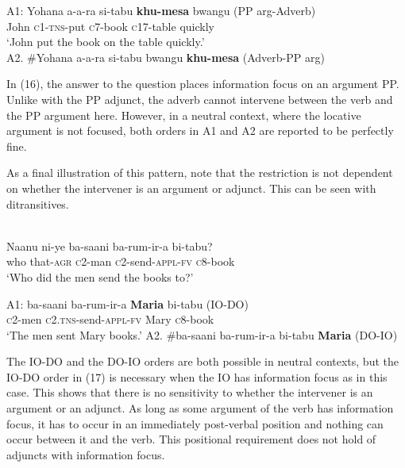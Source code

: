 \documentclass[output=paper]{langsci/langscibook}
\begin{document}
\ea\label{ex:}
\gll A1:  Yohana    a-a-ra  si-tabu    \textbf{{khu-mesa}}  bwangu     (PP arg-Adverb) \\
       John       \textsc{c1-tns-}put  \textsc{c}7-book   \textsc{c}17-table   quickly\\
\glt   ‘John put the book on the table quickly.’   \\ 
 A2.  \#Yohana   a-a-ra   si-tabu      bwangu   \textbf{khu-mesa}         (Adverb-PP arg)\\
\z
 


In (16), the answer to the question places information focus on an argument PP. Unlike with the PP adjunct, the adverb cannot intervene between the verb and the PP argument here. However, in a neutral context, where the locative argument is not focused, both orders in A1 and A2 are reported to be perfectly fine.

  As a final illustration of this pattern, note that the restriction is not dependent on whether the intervener is an argument or adjunct. This can be seen with ditransitives. 


\ea\label{ex:}
\\
\gll   Naanu    ni-ye    ba-saani   ba-rum-ir-a     bi-tabu?\\
     who     that-\textsc{agr}   \textsc{c}2-man   \textsc{c}2-send-\textsc{appl-fv}   \textsc{c}8-book\\
\glt ‘Who did the men send the books to?’
\z




\ea\label{ex:}
\gll A1:  ba-saani   ba-rum-ir-a    \textbf{{Maria}}     bi-tabu       (IO-DO) \\
       \textsc{c}2-men   \textsc{c2.tns}-send-\textsc{appl-fv}   Mary      \textsc{c}8-book  \\
\glt    ‘The men sent Mary books.’
 A2.  \#ba-saani  ba-rum-ir-a      bi-tabu   \textbf{Maria}  (DO-IO) \\
\z

The IO-DO and the DO-IO orders are both possible in neutral contexts, but the IO-DO order in (17) is necessary when the IO has information focus as in this case. This shows that there is no sensitivity to whether the intervener is an argument or an adjunct. As long as some argument of the verb has information focus, it has to occur in an immediately post-verbal position and nothing can occur between it and the verb. This positional requirement does not hold of adjuncts with information focus.
\end{document}
